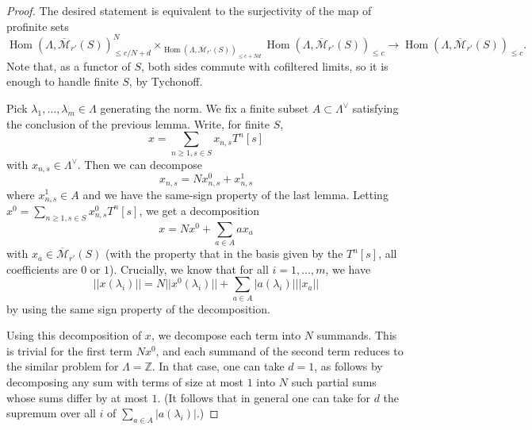 \documentclass[11pt]{amsbook}
\DeclareMathOperator{\Hom}{Hom}
\numberwithin{equation}{section}
\numberwithin{theorem}{section}
\theoremstyle{definition}
\begin{document}
\begin{proof} The desired statement is equivalent to the surjectivity of the map of profinite sets
\[
\Hom(\Lambda,\overline{\mathcal M}_{r'}(S))_{\leq c/N+d}^N\times_{\Hom(\Lambda,\overline{\mathcal M}_{r'}(S))_{\leq c+Nd}} \Hom(\Lambda,\overline{\mathcal M}_{r'}(S))_{\leq c}\to \Hom(\Lambda,\overline{\mathcal M}_{r'}(S))_{\leq c}.
\]
Note that, as a functor of $S$, both sides commute with cofiltered limits, so it is enough to handle finite $S$, by Tychonoff.

Pick $\lambda_1,\ldots,\lambda_m\in \Lambda$ generating the norm. We fix a finite subset $A\subset \Lambda^\vee$ satisfying the conclusion of the previous lemma. Write, for finite $S$,
\[
x=\sum_{n\geq 1, s\in S} x_{n,s} T^n [s]
\]
with $x_{n,s}\in \Lambda^\vee$. Then we can decompose
\[
x_{n,s} = N x_{n,s}^0 + x_{n,s}^1
\]
where $x_{n,s}^1\in A$ and we have the same-sign property of the last lemma. Letting $x^0 = \sum_{n\geq 1, s\in S} x_{n,s}^0 T^n [s]$, we get a decomposition
\[
x = Nx^0 + \sum_{a\in A} a x_a
\]
with $x_a\in \overline{\mathcal M}_{r'}(S)$ (with the property that in the
basis given by the $T^n [s]$, all coefficients are $0$ or $1$). Crucially,
we know that for all $i=1,\ldots,m$, we have
\[
||x(\lambda_i)|| = N ||x^0(\lambda_i)|| + \sum_{a\in A} |a(\lambda_i)| ||x_a||
\]
by using the same sign property of the decomposition.

Using this decomposition of $x$, we decompose each term into $N$ summands. This is trivial for the first term $Nx^0$, and each summand of the second term reduces to the similar problem for $\Lambda=\mathbb Z$. In that case, one can take $d=1$, as follows by decomposing any sum with terms of size at most $1$ into $N$ such partial sums whose sums differ by at most $1$. (It follows that in general one can take for $d$ the supremum over all $i$ of $\sum_{a\in A} |a(\lambda_i)|$.)
\end{proof}
\end{document}
